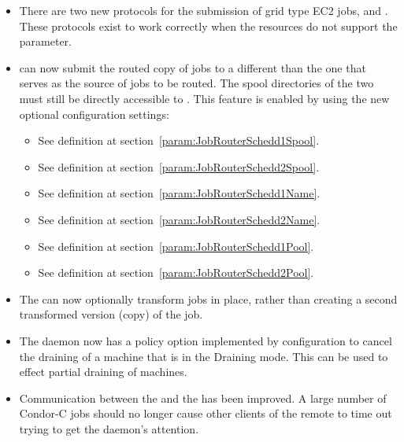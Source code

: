 \begin{itemize}

\item There are two new protocols for the submission of grid type EC2 jobs,
 and .
These protocols exist to work correctly when the resources do not support 
the  parameter.

\item {} can now submit the routed copy of jobs to a
different  than the one that serves as the source of
jobs to be routed.  The spool directories of the two
 must still be directly accessible to
.  This feature is enabled by using the new
optional configuration settings:

\begin{itemize}
\item {}
See definition at section~\ref{param:JobRouterSchedd1Spool}.
\item {}
See definition at section~\ref{param:JobRouterSchedd2Spool}.
\item {}
See definition at section~\ref{param:JobRouterSchedd1Name}.
\item {}
See definition at section~\ref{param:JobRouterSchedd2Name}.
\item {}
See definition at section~\ref{param:JobRouterSchedd1Pool}.
\item {}
See definition at section~\ref{param:JobRouterSchedd2Pool}.
\end{itemize}

\item The  can now optionally transform jobs in place,
rather than creating a second transformed version (copy) of the job.

\item The  daemon now has a policy option implemented
by configuration to cancel the draining
of a machine that is in the Draining mode.  This can be used to effect
partial draining of machines.

\item Communication between the  and the  has
been improved. A large number of Condor-C jobs should no longer cause
other clients of the remote  to time out trying to get the
 daemon's attention.


\end{itemize}
